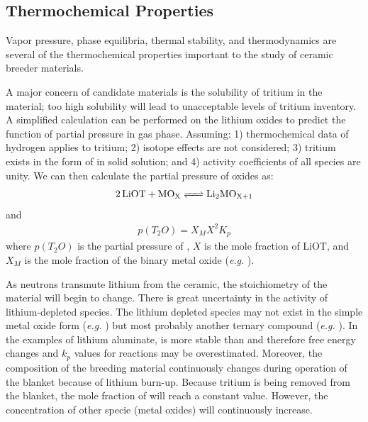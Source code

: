 \documentclass[11pt]{report} %
\newcommand{\lisix}{\ce{^6Li}}
\begin{document}



\subsection{Thermochemical Properties}
Vapor pressure, phase equilibria, thermal stability, and thermodynamics are several of the thermochemical properties important to the study of ceramic breeder materials. 

A major concern of candidate materials is the solubility of tritium in the material; too high solubility will lead to unacceptable levels of tritium inventory. A simplified calculation can be performed on the lithium oxides to predict the function of  partial pressure in gas phase. Assuming: 1) thermochemical data of hydrogen applies to tritium; 2) isotope effects are not considered; 3) tritium exists in the form of  in solid solution; and 4) activity coefficients of all species are unity. We can then calculate the partial pressure of oxides as:
\begin{align}\label{eq:liot-equilibrium}
\ce{2LiOT + MO_X <=> Li2MO_{X+1}}
\end{align}
and
\begin{align}
p(T_2O) = X_MX^2K_p
\end{align}
where $p(T_2O)$ is the partial pressure of , $X$ is the mole fraction of LiOT, and $X_M$ is the mole fraction of the binary metal oxide (\textit{e.g.} ). 

As neutrons transmute lithium from the ceramic, the stoichiometry of the material will begin to change. There is great uncertainty in the activity of lithium-depleted species. The lithium depleted species may not exist in the simple metal oxide form (\textit{e.g.} ) but most probably another ternary compound (\textit{e.g.} ). In the examples of lithium aluminate,  is more stable than  and therefore free energy changes and $k_p$ values for reactions may be overestimated. Moreover, the composition of the breeding material continuously changes during operation of the blanket because of lithium burn-up. Because tritium is being removed from the blanket, the mole fraction of  will reach a constant value. However, the concentration of other specie (metal oxides) will continuously increase.
\end{document}
